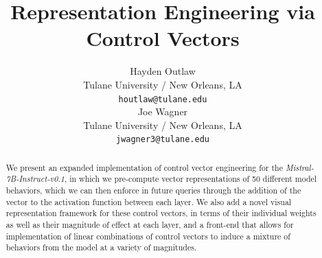 \documentclass[11pt,a4paper]{article}
\title{Representation Engineering via Control Vectors}
\author{Hayden Outlaw \\
  Tulane University / New Orleans, LA \\
  \texttt{houtlaw@tulane.edu} \\\And
  Joe Wagner \\
  Tulane University / New Orleans, LA \\
  \texttt{jwagner3@tulane.edu} \\}
\date{}
\begin{document}
\maketitle
\begin{abstract}
We present an expanded implementation of control vector engineering for the \emph{Mistral-7B-Instruct-v0.1}, in which we pre-compute vector representations of 50 different model behaviors, which we can then enforce in future queries through the addition of the vector to the activation function between each layer. We also add a novel visual representation framework for these control vectors, in terms of their individual weights as well as their magnitude of effect at each layer, and a front-end that allows for implementation of linear combinations of control vectors to induce a mixture of behaviors from the model at a variety of magnitudes. 
\end{abstract}

%

\end{document}
